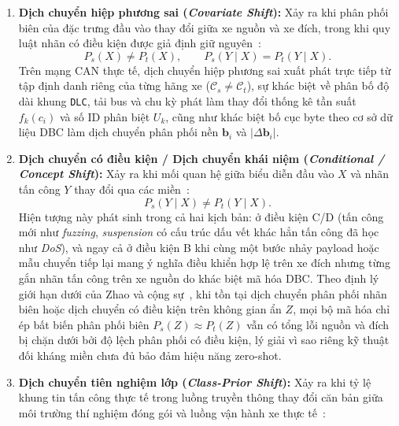 \documentclass[12pt, a4paper, reqno, oneside]{book}
\DeclareRobustCommand{\code}[1]{\nolinkurl{#1}}
\begin{document}
\begin{enumerate}
    \item \textbf{Dịch chuyển hiệp phương sai (\textit{Covariate Shift}):} Xảy ra khi phân phối biên của đặc trưng đầu vào thay đổi giữa xe nguồn và xe đích, trong khi quy luật nhãn có điều kiện được giả định giữ nguyên~\cite{shimodaira2000covariate,quinonerocandela2009dataset,morenotorres2012shift}:
    \begin{equation}\label{eq:covariate-shift}
    P_s(X) \neq P_t(X), \qquad P_s(Y \mid X) = P_t(Y \mid X).
    \end{equation}
    Trên mạng CAN thực tế, dịch chuyển hiệp phương sai xuất phát trực tiếp từ tập định danh riêng của từng hãng xe ($\mathcal{C}_s \neq \mathcal{C}_t$), sự khác biệt về phân bố độ dài khung \code{DLC}, tải bus và chu kỳ phát làm thay đổi thống kê tần suất $f_k(c_i)$ và số ID phân biệt $U_k$, cũng như khác biệt bố cục byte theo cơ sở dữ liệu DBC làm dịch chuyển phân phối nền $\mathbf{b}_i$ và $|\Delta \mathbf{b}_i|$.
    \item \textbf{Dịch chuyển có điều kiện / Dịch chuyển khái niệm (\textit{Conditional / Concept Shift}):} Xảy ra khi mối quan hệ giữa biểu diễn đầu vào $X$ và nhãn tấn công $Y$ thay đổi qua các miền~\cite{morenotorres2012shift,zhao2019invariant}:
    \begin{equation}\label{eq:conditional-shift}
    P_s(Y \mid X) \neq P_t(Y \mid X).
    \end{equation}
    Hiện tượng này phát sinh trong cả hai kịch bản: ở điều kiện C/D (tấn công mới như \textit{fuzzing}, \textit{suspension} có cấu trúc dấu vết khác hẳn tấn công đã học như \textit{DoS}), và ngay cả ở điều kiện B khi cùng một bước nhảy payload hoặc mẫu chuyển tiếp lại mang ý nghĩa điều khiển hợp lệ trên xe đích nhưng từng gắn nhãn tấn công trên xe nguồn do khác biệt mã hóa DBC. Theo định lý giới hạn dưới của Zhao và cộng sự~\cite{zhao2019invariant}, khi tồn tại dịch chuyển phân phối nhãn biên hoặc dịch chuyển có điều kiện trên không gian ẩn $Z$, mọi bộ mã hóa chỉ ép bất biến phân phối biên $P_s(Z) \approx P_t(Z)$ vẫn có tổng lỗi nguồn và đích bị chặn dưới bởi độ lệch phân phối có điều kiện, lý giải vì sao riêng kỹ thuật đối kháng miền chưa đủ bảo đảm hiệu năng zero-shot.
    \item \textbf{Dịch chuyển tiên nghiệm lớp (\textit{Class-Prior Shift}):} Xảy ra khi tỷ lệ khung tin tấn công thực tế trong luồng truyền thông thay đổi căn bản giữa môi trường thí nghiệm đóng gói và luồng vận hành xe thực tế~\cite{morenotorres2012shift}:
    \begin{equation}\label{eq:prior-shift}

\end{equation}
\end{enumerate}
\end{document}

